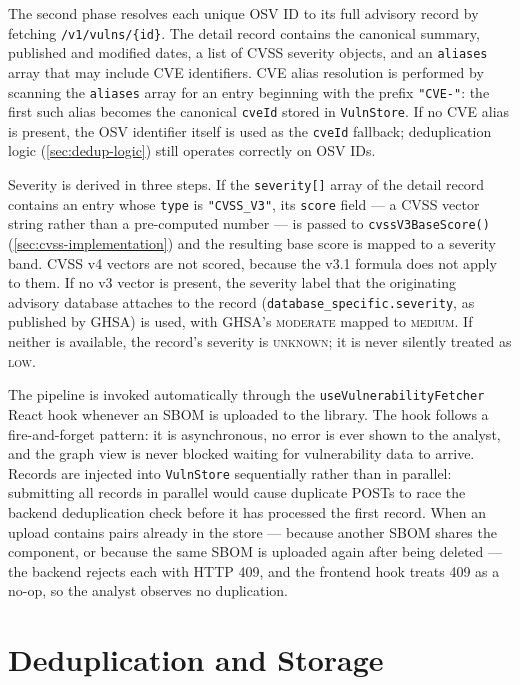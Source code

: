 The second phase resolves each unique OSV ID to its full advisory record by fetching \texttt{/v1/vulns/\{id\}}. The detail record contains the canonical summary, published and modified dates, a list of CVSS severity objects, and an \texttt{aliases} array that may include CVE identifiers. CVE alias resolution is performed by scanning the \texttt{aliases} array for an entry beginning with the prefix \texttt{"CVE-"}: the first such alias becomes the canonical \texttt{cveId} stored in \texttt{VulnStore}. If no CVE alias is present, the OSV identifier itself is used as the \texttt{cveId} fallback; deduplication logic (\autoref{sec:dedup-logic}) still operates correctly on OSV IDs.

Severity is derived in three steps. If the \texttt{severity[]} array of the detail record contains an entry whose \texttt{type} is \texttt{"CVSS\_V3"}, its \texttt{score} field --- a CVSS vector string rather than a pre-computed number --- is passed to \texttt{cvssV3BaseScore()} (\autoref{sec:cvss-implementation}) and the resulting base score is mapped to a severity band. CVSS v4 vectors are not scored, because the v3.1 formula does not apply to them. If no v3 vector is present, the severity label that the originating advisory database attaches to the record (\texttt{database\_specific.severity}, as published by GHSA) is used, with GHSA's \textsc{moderate} mapped to \textsc{medium}. If neither is available, the record's severity is \textsc{unknown}; it is never silently treated as \textsc{low}.

The pipeline is invoked automatically through the \texttt{useVulnerabilityFetcher} React hook whenever an SBOM is uploaded to the library. The hook follows a fire-and-forget pattern: it is asynchronous, no error is ever shown to the analyst, and the graph view is never blocked waiting for vulnerability data to arrive. Records are injected into \texttt{VulnStore} sequentially rather than in parallel: submitting all records in parallel would cause duplicate POSTs to race the backend deduplication check before it has processed the first record. When an upload contains pairs already in the store --- because another SBOM shares the component, or because the same SBOM is uploaded again after being deleted --- the backend rejects each with HTTP 409, and the frontend hook treats 409 as a no-op, so the analyst observes no duplication.


\section{Deduplication and Storage}
\label{sec:dedup-storage}

